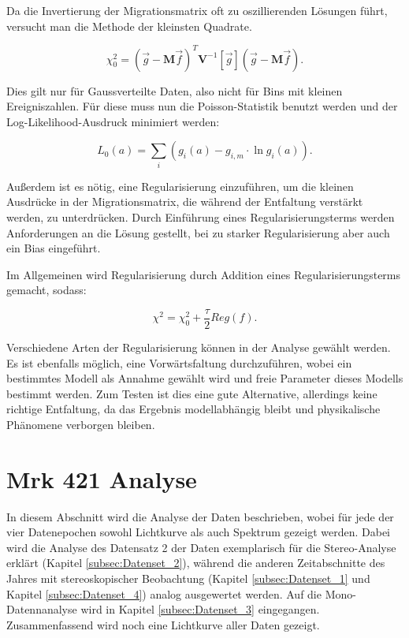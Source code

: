 Da die Invertierung der Migrationsmatrix oft zu oszillierenden Lösungen führt, versucht man die Methode der kleinsten Quadrate.

\begin{equation}
 \chi_0^2=(\vec{g}-\mathbf{M}\vec{f})^T \mathbf{V}^{-1}[\vec{g}](\vec{g}-\mathbf{M}\vec{f}).
\end{equation}

Dies gilt nur für Gaussverteilte Daten, also nicht für Bins mit kleinen Ereigniszahlen.
Für diese muss nun die Poisson-Statistik benutzt werden und der Log-Likelihood-Ausdruck minimiert werden:

\begin{equation}
 L_0(a)=\sum_i (g_i(a)-g_{i,m}\cdot \ln g_i(a)).
\end{equation}

Außerdem ist es nötig, eine Regularisierung einzuführen, um die kleinen Ausdrücke in der Migrationsmatrix, die während der Entfaltung verstärkt werden, zu unterdrücken.
Durch Einführung eines Regularisierungsterms werden Anforderungen an die Lösung gestellt, bei zu starker Regularisierung aber auch ein Bias eingeführt.

Im Allgemeinen wird Regularisierung durch Addition eines Regularisierungsterms gemacht, sodass:

\begin{equation}
 \chi^2=\chi_0^2 +\frac{\tau}{2} Reg(f).
\end{equation}

Verschiedene Arten der Regularisierung können in der Analyse gewählt werden.
Es ist ebenfalls möglich, eine Vorwärtsfaltung durchzuführen, wobei ein bestimmtes Modell als Annahme gewählt wird und freie Parameter dieses Modells bestimmt werden.
Zum Testen ist dies eine gute Alternative, allerdings keine richtige Entfaltung, da das Ergebnis modellabhängig bleibt und physikalische Phänomene verborgen bleiben.

\section{Mrk 421 Analyse}
\label{Mrk421_Analyse}
In diesem Abschnitt wird die Analyse der Daten beschrieben, wobei für jede der vier Datenepochen sowohl Lichtkurve als auch Spektrum gezeigt werden.
Dabei wird die Analyse des Datensatz 2 der Daten exemplarisch für die Stereo-Analyse erklärt (Kapitel \ref{subsec:Datenset_2}), während die anderen Zeitabschnitte des Jahres mit stereoskopischer Beobachtung (Kapitel \ref{subsec:Datenset_1} und Kapitel \ref{subsec:Datenset_4}) analog ausgewertet werden.
Auf die Mono-Datennanalyse wird in Kapitel \ref{subsec:Datenset_3} eingegangen.
Zusammenfassend wird noch eine Lichtkurve aller Daten gezeigt.


